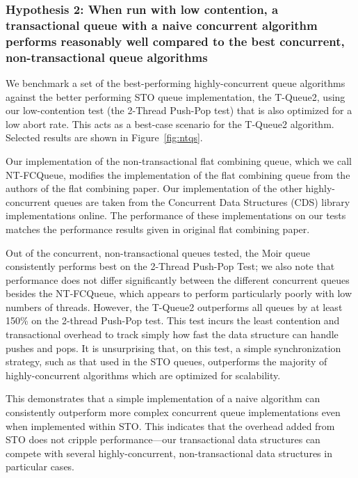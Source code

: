 \subsubsection{Hypothesis 2: When run with low contention, a transactional queue with a naive concurrent algorithm performs reasonably well compared to the best concurrent, non-transactional queue algorithms}

We benchmark a set of the best-performing highly-concurrent queue algorithms against the better performing STO queue implementation, the T-Queue2, using our low-contention test (the 2-Thread Push-Pop test) that is also optimized for a low abort rate. This acts as a best-case scenario for the T-Queue2 algorithm. Selected results are shown in Figure~\ref{fig:ntqs}.

Our implementation of the non-transactional flat combining queue, which we call NT-FCQueue, modifies the implementation of the flat combining queue from the authors of the flat combining paper\cite{flatcombining}. Our implementation of the other highly-concurrent queues are taken from the Concurrent Data Structures (CDS) library implementations online\cite{libcds}. The performance of these implementations on our tests matches the performance results given in original flat combining paper. 

Out of the concurrent, non-transactional queues tested, the Moir queue\cite{queue2} consistently performs best on the 2-Thread Push-Pop Test; we also note that performance does not differ significantly between the different concurrent queues besides the NT-FCQueue, which appears to perform particularly poorly with low numbers of threads. However, the T-Queue2 outperforms all queues by at least 150\% on the 2-thread Push-Pop test. This test incurs the least contention and transactional overhead to track simply how fast the data structure can handle pushes and pops. It is unsurprising that, on this test, a simple synchronization strategy, such as that used in the STO queues, outperforms the majority of highly-concurrent algorithms which are optimized for scalability. 

This demonstrates that a simple implementation of a naive algorithm can consistently outperform more complex concurrent queue implementations even when implemented within STO. This indicates that the overhead added from STO does not cripple performance---our transactional data structures can compete with several highly-concurrent, non-transactional data structures in particular cases. 

